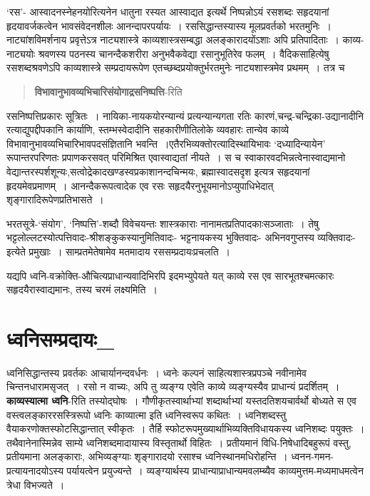 {‘रस’- आस्वादनस्नेहनयोरित्यनेन धातुना रस्यत आस्वाद्यत इत्यर्थे निष्पन्नोऽयं रसशब्दः सहृदयानां हृदयावर्जकत्वेन भावसंवेदनशीलः आनन्दापरपर्यायः~। रससिद्धान्तस्यास्य मूलप्रवर्तको भरतमुनिः~। नाट्यांशविमर्शनाय प्रवृत्तेऽत्र नाट्यशास्त्रे काव्यशास्त्रसम्बद्धा अलङ्कारादयोंऽशाः अपि प्रतिपादिताः~। काव्य-नाट्ययोः श्रवणस्य पठनस्य चानन्दैकशरीरा अनुभवैकवेद्या रसानुभूतिरेव फलम्~। वैदिकसाहित्येषु रसशब्दश्रवणेऽपि काव्यशास्त्रे सम्प्रदायरूपेण एतच्छब्दप्रयोक्तुर्भरतमुनेः नाट्यशास्त्रमेव प्रथमम्~। तत्र च 

\begin{verse}
\textbf{विभावानुभावव्यभिचारिसंयोगाद्रसनिष्पत्ति}-रिति 
\end{verse}

रसनिष्पत्तिप्रकारः सूत्रितः~। नायिका-नायकयोरन्यान्यं प्रत्यन्यान्यगता रतिः कारणं,\break चन्द्र-चन्द्रिका-उद्यानादीनि रत्याद्युपद्दीपकानि कार्याणि, स्तम्भस्वेदादीनि सहकारीणीति\break लोके व्यवहारः तान्येव काव्ये विभावानुभावव्यभिचारिभावपदसंज्ञितानि भवन्ति~।\break  एतैरभिव्यक्तोरत्यादिस्थायिभावः ‘दध्यादिन्यायेन’ रूपान्तरपरिणतः प्रपाणकरसवत् परिमि\-श्रित एवास्वाद्यतां नीयते~। स च स्वाकारवदभिन्नत्वेनास्वाद्यमानो वेद्यान्तरस्पर्शशून्यः,\break सत्वोद्रेकादखण्डस्वप्रकाशानन्दचिन्मयः, ब्रह्मास्वादसदृश इत्यत्र सहृदयानां हृदयमेव\break प्रमाणम्~। आनन्दैकरूपत्वादेक एव रसः सहृदयैरनुभूयमानोऽप्युपाधिभेदात् शृङ्गारादिरूपेण\break प्रतिभासते~। 

भरतसूत्रे-‘संयोग’, ‘निष्पत्ति’-शब्दौ विवेचयन्तः शास्त्रकाराः नानामतप्रतिपादकाः\break	 सञ्जाताः~। तेषु भट्टलोल्लटस्योत्पत्तिवादः-श्रीशङ्कुकस्यानुमितिवादः- भट्टनायकस्य भुक्तिवादः- अभिनवगुप्तस्य व्यक्तिवादः-इत्येते प्रमुखाः~। साम्प्रतमेतेषामेव मतमादाय रससम्प्रदायः\break प्रचलति~। 

यद्यपि ध्वनि-वक्रोक्ति-औचित्यप्राधान्यवादिभिरपि इदमभ्युपेयते यत् काव्ये रस एव सारभूतश्चमत्कारः सहृदयैरास्वाद्यमानः, तस्य चरमं लक्ष्यमिति~। 

\section*{ ध्वनिसम्प्रदायः\_}

ध्वनिसिद्धान्तस्य प्रवर्तकः आचार्यानन्दवर्धनः~। ध्वनेः कल्पनं साहित्यशास्त्रप्रपञ्चे नवीनामेव चिन्तनधारामसृजत्~। रसो न वाच्यः, अपि तु व्यङ्ग्य एवेति काव्ये व्यङ्ग्यस्यैव प्राधान्यं प्रदर्शितम्~। \textbf{काव्यस्यात्मा ध्वनि}-रिति तस्योद्घोषः~। गौणीकृतस्वार्थाभ्यां शब्दार्थाभ्यां यस्तदतिशयचार्वर्थो बोध्यते स एव वस्त्वलङ्काररसस्त्रिरूपो ध्वनिः काव्यात्मा इति ध्वनिस्वरूप कथितः~। ध्वनिशब्दस्तु वैयाकरणोक्तस्फोटसिद्धान्तात् स्वीकृतः~। तैर्हि स्फोटरूपमुख्यार्थाभिव्यक्तिविधायकस्य ध्वनिशब्दः पयुक्तः~। तथैवानेनास्मिन्नेव साम्ये ध्वनिशब्दमादायास्य विस्तृतार्थो विहितः~। प्रतीयमानं विधि-निषेधादिबहुरूपं वस्तु, प्रतीयमाना अलङ्काराः, अभिव्यङ्ग्याः शृङ्गारादयो रसाश्च ध्वनिस्थानमधिरोहन्ति~। ध्वनन-गमन-प्रत्यायनादयोऽस्य पर्यायत्वेन प्रयुज्यन्ते~। व्यङ्ग्यार्थस्य प्राधान्याप्राधान्यमवलम्ब्यैव काव्यमुत्तम-मध्यमाधमत्वेन त्रेधा विभज्यते~। 

}
